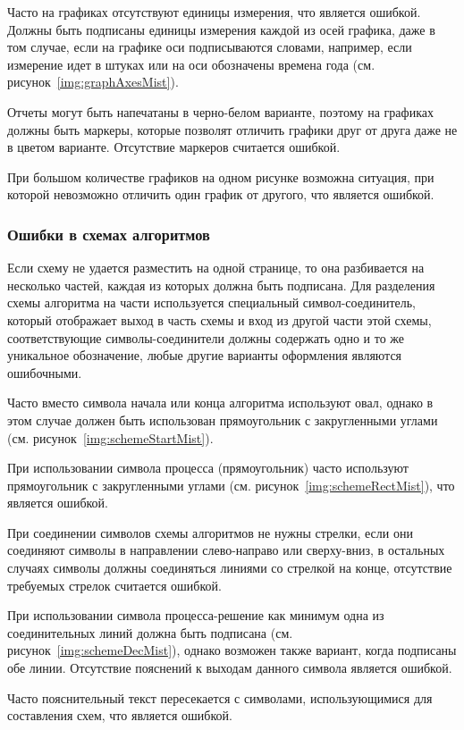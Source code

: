 Часто на графиках отсутствуют единицы измерения, что является ошибкой. Должны быть подписаны единицы измерения каждой из осей графика, даже в том случае, если на графике оси подписываются словами, например, если измерение идет в штуках или на оси обозначены времена года (см. рисунок~\ref{img:graphAxesMist}).

Отчеты могут быть напечатаны в черно-белом варианте, поэтому на графиках должны быть маркеры, которые позволят отличить графики друг от друга даже не в цветом варианте. Отсутствие маркеров считается ошибкой.

При большом количестве графиков на одном рисунке возможна ситуация, при которой невозможно отличить один график от другого, что является ошибкой.

\subsubsection{Ошибки в схемах алгоритмов}
Если схему не удается разместить на одной странице, то она разбивается на несколько частей, каждая из которых должна быть подписана. Для разделения схемы алгоритма на части используется специальный символ-соединитель, который отображает выход в часть схемы и вход из другой части этой схемы, соответствующие символы-соединители должны содержать одно и то же уникальное обозначение, любые другие варианты оформления являются ошибочными.

Часто вместо символа начала или конца алгоритма используют овал, однако в этом случае должен быть использован прямоугольник с закругленными углами (см. рисунок~\ref{img:schemeStartMist}).

При использовании символа процесса (прямоугольник) часто используют прямоугольник с закругленными углами (см. рисунок~\ref{img:schemeRectMist}), что является ошибкой.

При соединении символов схемы алгоритмов не нужны стрелки, если они соединяют символы в направлении слево-направо или сверху-вниз, в остальных случаях символы должны соединяться линиями со стрелкой на конце, отсутствие требуемых стрелок считается ошибкой.

При использовании символа процесса-решение как минимум одна из соединительных линий должна быть подписана (см. рисунок~\ref{img:schemeDecMist}), однако возможен также вариант, когда подписаны обе линии. Отсутствие пояснений к выходам данного символа является ошибкой.

Часто пояснительный текст пересекается с символами, использующимися для составления схем, что является ошибкой.

